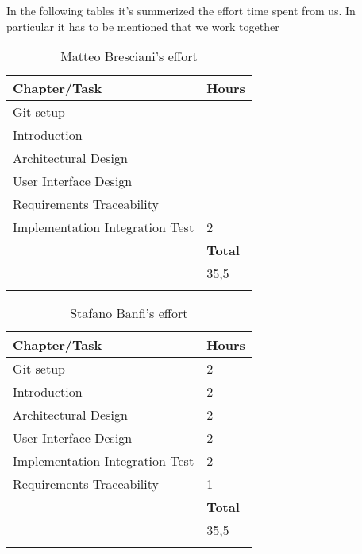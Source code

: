 In the following tables it's summerized the effort time spent from us. In particular it has to be mentioned that we work together 
	\begin{longtable}{| p{5 cm} | p{1 cm} |} 
			\hline
			{\bf Chapter/Task} & {\bf Hours}\\
			\hline
            Git setup &  \\
			Introduction &  \\
			Architectural Design &  \\
			User Interface Design & \\
			Requirements Traceability &  \\
			Implementation Integration Test & 2 \\
			\hline
			&  {\bf Total} \\
			\hline
			&  35,5 \\
			\hline
			\caption{Matteo Bresciani's effort}
		\end{longtable}

			\begin{longtable}{| p{5 cm} | p{1 cm} |} 
			\hline
			{\bf Chapter/Task} & {\bf Hours}\\
			\hline
            Git setup & 2 \\
			Introduction & 2 \\
			Architectural Design & 2 \\
			User Interface Design & 2 \\
			Implementation Integration Test & 2 \\
			Requirements Traceability & 1 \\
			\hline
			&  {\bf Total} \\
			\hline
			&  35,5 \\
			\hline
			\caption{Stafano Banfi's effort}
		\end{longtable}
	